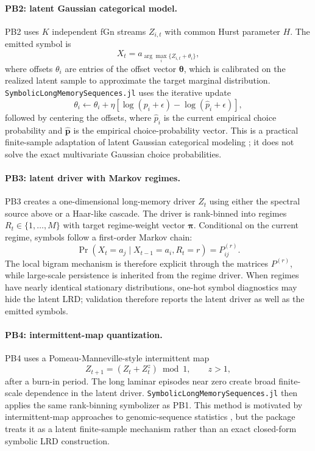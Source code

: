 \documentclass[journal]{IEEEtran}
\newcommand{\pkg}[1]{\texttt{#1}}
\newcommand{\vect}[1]{\boldsymbol{#1}}
\newcommand{\sfive}{\pkg{SymbolicLongMemorySequences.jl}}
\begin{document}
\paragraph{PB2: latent Gaussian categorical model.}
PB2 uses $K$ independent fGn streams $Z_{i,t}$ with common Hurst parameter $H$.
The emitted symbol is
\begin{equation}
  X_t = a_{\arg\max_i \{Z_{i,t}+\theta_i\}},
\end{equation}
where offsets \(\theta_i\) are entries of the offset vector \(\vect{\theta}\),
which is calibrated on the realized latent sample to
approximate the target marginal distribution. \sfive{} uses the iterative update
\begin{equation}
  \theta_i \leftarrow \theta_i
      + \eta\left[\log(p_i+\epsilon)-\log(\hat p_i+\epsilon)\right],
\end{equation}
followed by centering the offsets, where \(\hat p_i\) is the current empirical
choice probability and \(\hat{\vect{p}}\) is the empirical choice-probability
vector. This is a practical finite-sample adaptation of latent
Gaussian categorical modeling \cite{gal2015_latent}; it does not solve the
exact multivariate Gaussian choice probabilities.

\paragraph{PB3: latent driver with Markov regimes.}
PB3 creates a one-dimensional long-memory driver $Z_t$ using either the spectral
source above or a Haar-like cascade. The driver is rank-binned into regimes
\(R_t\in\{1,\ldots,M\}\) with target regime-weight vector \(\vect{\pi}\).
Conditional on the
current regime, symbols follow a first-order Markov chain:
\begin{equation}
  \Pr(X_t=a_j\mid X_{t-1}=a_i,R_t=r) = P^{(r)}_{ij}.
\end{equation}
The local bigram mechanism is therefore explicit through the matrices
$P^{(r)}$, while large-scale persistence is inherited from the regime driver.
When regimes have nearly identical stationary distributions, one-hot symbol
diagnostics may hide the latent LRD; validation therefore reports the latent
driver as well as the emitted symbols.

\paragraph{PB4: intermittent-map quantization.}
PB4 uses a Pomeau-Manneville-style intermittent map
\begin{equation}
  Z_{t+1} = (Z_t + Z_t^z) \bmod 1, \qquad z>1,
\end{equation}
after a burn-in period. The long laminar episodes near zero create broad
finite-scale dependence in the latent driver. \sfive{} then applies the same
rank-binning symbolizer as PB1. This method is motivated by intermittent-map
approaches to genomic-sequence statistics \cite{provata2012_coupled}, but the
package treats it as a latent finite-sample mechanism rather than an exact
closed-form symbolic LRD construction.
\end{document}
